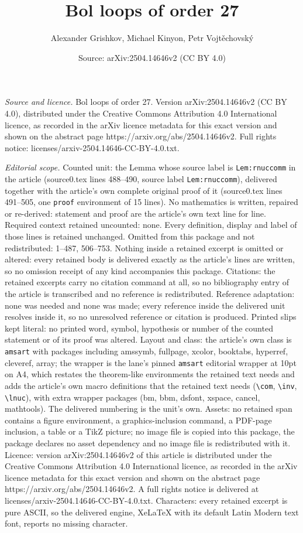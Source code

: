 \documentclass[10pt,a4paper]{amsart}
\title[Bol loops of order 27]{Bol loops of order 27}
\author{Alexander Grishkov, Michael Kinyon, Petr Vojt\v{e}chovsk\'y}
\date{Source: arXiv:2504.14646v2 (CC BY 4.0)}
\begin{document}
\maketitle

\noindent\emph{Source and licence.} Bol loops of order 27. Version arXiv:2504.14646v2 (CC BY 4.0), distributed under the Creative Commons Attribution 4.0 International licence, as recorded in the arXiv licence metadata for this exact version and shown on the abstract page https://arxiv.org/abs/2504.14646v2. Full rights notice: licenses/arxiv-2504.14646-CC-BY-4.0.txt.\par\smallskip

\noindent\textit{Editorial scope.} Counted unit: the Lemma whose source label is \texttt{Lem:rnuccomm} in the article (source0.tex lines 488--490, source label \texttt{Lem:rnuccomm}), delivered together with the article's own complete original proof of it (source0.tex lines 491--505, one \texttt{proof} environment of 15 lines). No mathematics is written, repaired or re-derived: statement and proof are the article's own text line for line. Required context retained uncounted: none. Every definition, display and label of those lines is retained unchanged. Omitted from this package and not redistributed: 1--487, 506--753. Nothing inside a retained excerpt is omitted or altered: every retained body is delivered exactly as the article's lines are written, so no omission receipt of any kind accompanies this package. Citations: the retained excerpts carry no citation command at all, so no bibliography entry of the article is transcribed and no reference is redistributed. Reference adaptation: none was needed and none was made; every reference inside the delivered unit resolves inside it, so no unresolved reference or citation is produced. Printed slips kept literal: no printed word, symbol, hypothesis or number of the counted statement or of its proof was altered. Layout and class: the article's own class is \texttt{amsart} with packages including amssymb, fullpage, xcolor, booktabs, hyperref, cleveref, array; the wrapper is the lane's pinned \texttt{amsart} editorial wrapper at 10pt on A4, which restates the theorem-like environments the retained text needs and adds the article's own macro definitions that the retained text needs (\texttt{\textbackslash com}, \texttt{\textbackslash inv}, \texttt{\textbackslash lnuc}), with extra wrapper packages (bm, bbm, dsfont, xspace, cancel, mathtools). The delivered numbering is the unit's own. Assets: no retained span contains a figure environment, a graphics-inclusion command, a PDF-page inclusion, a table or a TikZ picture; no image file is copied into this package, the package declares no asset dependency and no image file is redistributed with it. Licence: version arXiv:2504.14646v2 of this article is distributed under the Creative Commons Attribution 4.0 International licence, as recorded in the arXiv licence metadata for this exact version and shown on the abstract page https://arxiv.org/abs/2504.14646v2. A full rights notice is delivered at licenses/arxiv-2504.14646-CC-BY-4.0.txt. Characters: every retained excerpt is pure ASCII, so the delivered engine, XeLaTeX with its default Latin Modern text font, reports no missing character.
\end{document}
